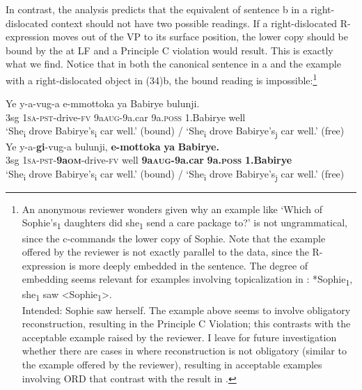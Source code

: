 \documentclass[output=paper,newtxmath,modfonts,nonflat,hidelinks]{langsci/langscibook}
\begin{document}
{In contrast, the analysis predicts that the equivalent of sentence b in a right-dislocated context should not have two possible readings. If a right-dislocated R-expression moves out of the VP to its surface position, the lower copy should be bound by the  at LF and a Principle C violation would result. This is exactly what we find. Notice that in both the canonical sentence in a and the example with a right-dislocated object in (34)b, the bound reading is impossible}:\footnote{An anonymous reviewer wonders given  why an  example like ‘Which of Sophie’s\textsubscript{1} daughters did she\textsubscript{1} send a care package to?’ is not ungrammatical, since the  c-commands the lower copy of Sophie. Note that the example offered by the reviewer is not exactly parallel to the  data, since the R-expression is more deeply embedded in the  sentence. The degree of embedding seems relevant for examples involving topicalization in :
\ea
*Sophie\textsubscript{1}, she\textsubscript{1} saw <Sophie\textsubscript{1}>.\\Intended: Sophie saw herself.
\z
The example above seems to involve obligatory reconstruction, resulting in the Principle C Violation; this contrasts with the acceptable example raised by the reviewer. I leave for future investigation whether there are cases in  where reconstruction is not obligatory (similar to the example offered by the reviewer), resulting in acceptable examples involving ORD that contrast with the result in .}


\ea\label{ex:ranero:34}
\ea\label{ex:ranero:34a}
\gll Ye  y-a-vug-a             e-mmottoka   ya          Babirye   bulunji.\\
3sg \textsc{1sa-pst}{}-drive-\textsc{fv} 9a\textsc{aug}{}-9a.car 9a.\textsc{poss} 1.Babirye well\\
\glt *‘She\textsubscript{i} drove Babirye’s\textsubscript{i} car well.’ (bound) / ‘She\textsubscript{i} drove Babirye’s\textsubscript{j} car well.’ (free)
\ex\label{ex:ranero:34b}
\gll Ye  y-a-\textbf{gi}{}-vug-a          bulunji, \textbf{e-mottoka}       \textbf{ya}          \textbf{Babirye.}\\
3sg \textsc{1sa-pst}{}-\textbf{9a\textsc{om}}{}-drive-\textsc{fv} well       \textbf{9a\textsc{aug}}\textbf{{}-9a.car} \textbf{9a.}\textbf{\textsc{poss}} \textbf{1.Babirye}\\
\glt *‘She\textsubscript{i} drove Babirye’s\textsubscript{i} car well.’ (bound) / ‘She\textsubscript{i} drove Babirye’s\textsubscript{j} car well.’ (free)
\z
\z
\end{document}
